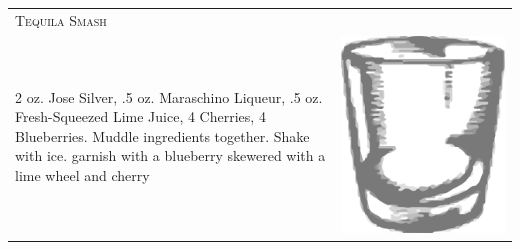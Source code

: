 \documentclass{article}
\begin{document}
\begin{tabular}{p{2in} p{0.5in}}
\multicolumn{2}{p{3in}}{\centering\Huge\textsc{Tequila Smash}} \\ 
  \vspace{-0.1in}2 oz. Jose Silver, .5 oz. Maraschino Liqueur, .5 oz. Fresh-Squeezed Lime Juice, 4 Cherries, 4 Blueberries. Muddle ingredients together. Shake with ice.  garnish with a blueberry skewered with a lime wheel and cherry &
  \vspace{-0.1in} \includegraphics{rocks_glass.png}
\end{tabular}
\end{document}
